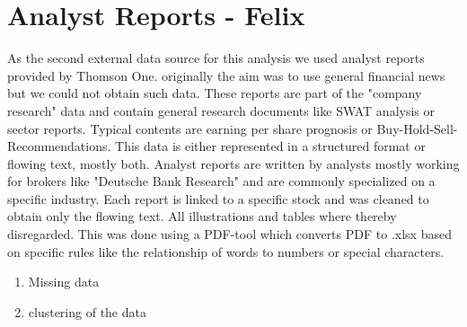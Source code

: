 \section{Analyst Reports - Felix}
As the second external data source for this analysis we used analyst reports provided by Thomson One. originally the aim was to use general financial news but we could not obtain such data. These reports are part of the "company research" data and contain general research documents like SWAT analysis or sector reports. Typical contents are earning per share prognosis or Buy-Hold-Sell-Recommendations. This data is either represented in a structured format or flowing text, mostly both. Analyst reports are written by analysts mostly working for brokers like "Deutsche Bank Research" and are commonly specialized on a specific industry.  Each report is linked to a specific stock and was cleaned to obtain only the flowing text. All illustrations and tables where thereby disregarded. This was done using a PDF-tool which converts PDF to .xlsx based on specific rules like the relationship of words to numbers or special characters. 

\begin{enumerate}
    \item Missing data
    \item clustering of the data
\end{enumerate}


